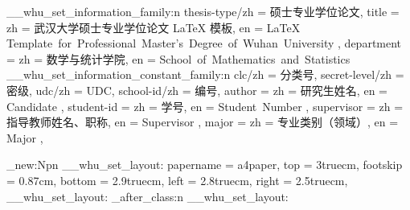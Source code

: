   {
    \__whu_set_information_family:n
      {
        thesis-type/zh =  硕士专业学位论文,
        title =
          {
            zh = 武汉大学硕士专业学位论文 \LaTeX{} 模板,
            en = \LaTeX{} Template~for~Professional~Master's~Degree~of~Wuhan~University
          },
        department =
          {
            zh = 数学与统计学院,
            en = School~of~Mathematics~and~Statistics
          }
      }
    \__whu_set_information_constant_family:n
      {
        clc/zh          = 分类号,
        secret-level/zh = 密级,
        udc/zh          = UDC,
        school-id/zh    = 编号,
        author =
          {
            zh = 研究生姓名,
            en = Candidate
          },
        student-id =
          {
            zh = 学号,
            en = Student~Number
          },
        supervisor =
          {
            zh = 指导教师姓名、职称,
            en = Supervisor
          },
        major =
          {
            zh = 专业类别（领域）,
            en = Major
          },
      }
  }










\cs_new:Npn \__whu_set_layout:
  {
    \setuplayout
      {
        papername = a4paper,
        top       = 3truecm,
        footskip  = 0.87cm,  %
        bottom    = 2.9truecm,
        left      = 2.8truecm,
        right     = 2.5truecm,
      }
  }
  { \__whu_set_layout: }
  { \whu_after_class:n { \__whu_set_layout: } }



